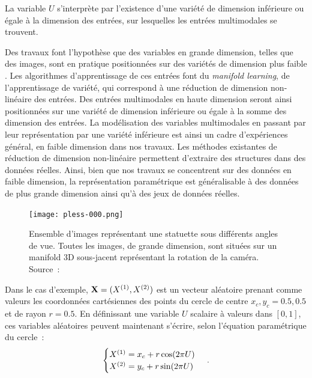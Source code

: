 \documentclass[../main]{subfiles}
\begin{document}
La variable $U$ s'interprète par l'existence d'une variété de dimension inférieure ou égale à la dimension des entrées, sur lesquelles les entrées multimodales se trouvent.

Des travaux font l'hypothèse que des variables en grande dimension, telles que des images, sont en pratique positionnées sur des variétés de dimension plus faible \cite{Pless2009ASO}.
Les algorithmes d'apprentissage de ces entrées font du \emph{manifold learning}, de l'apprentissage de variété, qui correspond à une réduction de dimension non-linéaire des entrées.
Des entrées multimodales en haute dimension seront ainsi positionnées sur une variété de dimension inférieure ou égale à la somme des dimension des entrées.
La modélisation des variables multimodales en passant par leur représentation par une variété inférieure est ainsi un cadre d'expériences général, en faible dimension dans nos travaux.
Les méthodes existantes de réduction de dimension non-linéaire permettent d'extraire des structures dans des données réelles.
Ainsi, bien que nos travaux se concentrent sur des données en faible dimension, la représentation paramétrique est généralisable à des données de plus grande dimension ainsi qu'à des jeux de données réelles.

\begin{figure}
    \centering
    \texttt{[image: pless-000.png]}
    \caption{Ensemble d'images représentant une statuette sous différents angles de vue. Toutes les images, de grande dimension, sont situées sur un manifold 3D sous-jacent représentant la rotation de la caméra. Source~:~\cite{Pless2009ASO}}
\end{figure}


Dans le cas d'exemple, $\mathbf{X} = (X^{({1})},X^{({2})})$ est un vecteur aléatoire prenant comme valeurs les coordonnées cartésiennes des points du cercle de centre $x_c,y_c = 0.5,0.5$ et de rayon $r = 0.5$.
En définissant une variable $U$ scalaire à valeurs dans $[0,1]$, ces variables aléatoires peuvent maintenant s'écrire, selon l'équation paramétrique du cercle~:
\begin{equation}
 \begin{cases}
     X^{({1})}= x_c + r  \cos(2\pi U)\\
     X^{({2})} = y_c + r \sin(2 \pi U)
    \end{cases}\,.
\end{equation}
\end{document}
